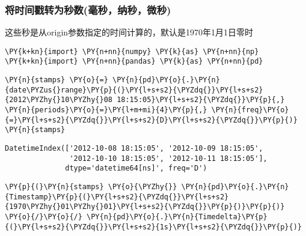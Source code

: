     \hypertarget{ux5c06ux65f6ux95f4ux6233ux8f6cux4e3aux79d2ux6570ux6bebux79d2ux7eb3ux79d2ux5faeux79d2}{%
\subsubsection{将时间戳转为秒数(毫秒，纳秒，微秒)}\label{ux5c06ux65f6ux95f4ux6233ux8f6cux4e3aux79d2ux6570ux6bebux79d2ux7eb3ux79d2ux5faeux79d2}}

    这些秒是从origin参数指定的时间计算的，默认是1970年1月1日零时

    \begin{tcolorbox}[breakable, size=fbox, boxrule=1pt, pad at break*=1mm,colback=cellbackground, colframe=cellborder]
\begin{Verbatim}[commandchars=\\\{\}]
\PY{k+kn}{import} \PY{n+nn}{numpy} \PY{k}{as} \PY{n+nn}{np}
\PY{k+kn}{import} \PY{n+nn}{pandas} \PY{k}{as} \PY{n+nn}{pd}
\end{Verbatim}
\end{tcolorbox}

    \begin{tcolorbox}[breakable, size=fbox, boxrule=1pt, pad at break*=1mm,colback=cellbackground, colframe=cellborder]
\begin{Verbatim}[commandchars=\\\{\}]
\PY{n}{stamps} \PY{o}{=} \PY{n}{pd}\PY{o}{.}\PY{n}{date\PYZus{}range}\PY{p}{(}\PY{l+s+s2}{\PYZdq{}}\PY{l+s+s2}{2012\PYZhy{}10\PYZhy{}08 18:15:05}\PY{l+s+s2}{\PYZdq{}}\PY{p}{,} \PY{n}{periods}\PY{o}{=}\PY{l+m+mi}{4}\PY{p}{,} \PY{n}{freq}\PY{o}{=}\PY{l+s+s2}{\PYZdq{}}\PY{l+s+s2}{D}\PY{l+s+s2}{\PYZdq{}}\PY{p}{)}
\PY{n}{stamps}
\end{Verbatim}
\end{tcolorbox}

            \begin{tcolorbox}[breakable, size=fbox, boxrule=.5pt, pad at break*=1mm, opacityfill=0]
\begin{Verbatim}[commandchars=\\\{\}]
DatetimeIndex(['2012-10-08 18:15:05', '2012-10-09 18:15:05',
               '2012-10-10 18:15:05', '2012-10-11 18:15:05'],
              dtype='datetime64[ns]', freq='D')
\end{Verbatim}
\end{tcolorbox}
        
    \begin{tcolorbox}[breakable, size=fbox, boxrule=1pt, pad at break*=1mm,colback=cellbackground, colframe=cellborder]
\begin{Verbatim}[commandchars=\\\{\}]
\PY{p}{(}\PY{n}{stamps} \PY{o}{\PYZhy{}} \PY{n}{pd}\PY{o}{.}\PY{n}{Timestamp}\PY{p}{(}\PY{l+s+s2}{\PYZdq{}}\PY{l+s+s2}{1970\PYZhy{}01\PYZhy{}01}\PY{l+s+s2}{\PYZdq{}}\PY{p}{)}\PY{p}{)} \PY{o}{/}\PY{o}{/} \PY{n}{pd}\PY{o}{.}\PY{n}{Timedelta}\PY{p}{(}\PY{l+s+s2}{\PYZdq{}}\PY{l+s+s2}{1s}\PY{l+s+s2}{\PYZdq{}}\PY{p}{)}
\end{Verbatim}
\end{tcolorbox}


